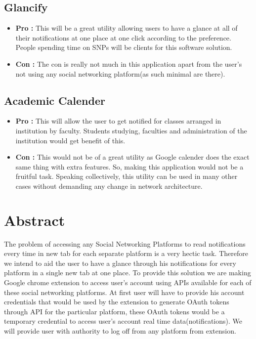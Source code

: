 \documentclass[12pt]{article}
\begin{document}
    \subsection{Glancify}
    \begin{itemize}
        \item \textbf{Pro :} This will be a great utility allowing users to have a glance at all of their notifications at one place at one click according to the preference. People spending time on SNPs will be clients for this software solution.
        
        \item \textbf{Con :} The con is really not much in this application apart from the user's not using any social networking platform(as such minimal are there).
	 
     
    \end{itemize}
    
    
	\subsection{Academic Calender}
	\begin{itemize}
	    \item 
	\textbf{Pro :} This will allow the user to get notified for classes arranged in institution by faculty. Students studying, faculties and administration of the institution would get benefit of this. 
	\item
	\textbf{Con :} This would not be of a great utility as Google calender does the exact same thing with extra features. So, making this application would not be a fruitful task.
	Speaking collectively, this utility can be used in many other cases without demanding any change in network architecture.
	\end{itemize}
    
	\section{Abstract}
    The problem of accessing any Social Networking Platforms to read notifications every time in new tab for each separate platform is a very hectic task. Therefore we intend to aid the user to have a glance through his notifications for every platform in a single new tab at one place. To provide this solution we are making Google chrome extension to access user's account using APIs available for each of these social networking platforms. At first user will have to provide his account credentials that would be used by the extension to generate OAuth tokens through API for the particular platform, these OAuth tokens would be a temporary credential to access user's account real time data(notifications). We will provide user with authority to log off from any platform from extension.
	    
\end{document}

